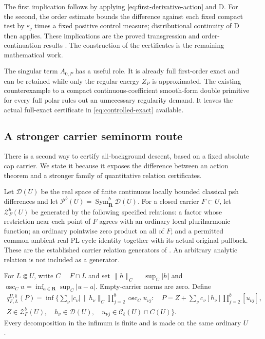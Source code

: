 \documentclass[11pt,a4paper]{article}
\newcommand{\MathEqref}[1]{{\hypersetup{linkcolor=EquationLink}\eqref{#1}}}
\theoremstyle{definition}
\theoremstyle{remark}
\numberwithin{equation}{section}
\newcommand{\R}{\mathbf R}
\newcommand{\D}{\mathrm D}
\newcommand{\Cb}{\mathcal C_b}
\newcommand{\osc}{\operatorname{osc}}
\newcommand{\Sym}{\operatorname{Sym}}
\begin{document}
The first implication follows by applying
\MathEqref{eq:first-derivative-action} and $\D$.  For the second, the
order estimate bounds the difference against each fixed compact test
by $\varepsilon_j$ times a fixed positive control measure; distributional
continuity of $\D$ then applies.  These implications are the proved
transgression and order-continuation results \cite{QA,Order}.  The
construction of the certificates is the remaining mathematical work.

The singular term $A_{0,P}$ has a useful role.  It is already full
first-order exact and can be retained while only the regular energy
$Z_P$ is approximated.  The existing counterexample to a compact
continuous-coefficient smooth-form double primitive for every full
polar \cite{R24} rules out an unnecessary regularity demand.  It leaves
the actual full-exact certificate in
\MathEqref{eq:controlled-exact} available.

\subsection{A stronger carrier seminorm route}

There is a second way to certify all-background descent, based on a
fixed absolute cap carrier.  We state it because it exposes the
difference between an action theorem and a stronger family of
quantitative relation certificates.

Let $\mathcal D(U)$ be the real space of finite continuous locally
bounded classical psh differences and let
$\mathcal P^b(U)=\Sym^b_\R\mathcal D(U)$.  For a closed carrier
$F\subset U$, let $\mathcal Z_F^b(U)$ be generated by the following
specified relations: a factor whose restriction near each point of $F$
agrees with an ordinary local pluriharmonic function; an ordinary
pointwise zero product on all of $F$; and a permitted common ambient
real PL cycle identity together with its actual original pullback.
These are the established carrier relation generators of \cite{R24}.
An arbitrary analytic relation is not included as a generator.

For $L\Subset U$, write $C=F\cap L$ and set
$\|h\|_C=\sup_C|h|$ and
$\osc_Cu=\inf_{a\in\R}\sup_C|u-a|$.  Empty-carrier norms are zero.
Define
\begin{equation}
 \begin{split}
 q^{U,b}_{F,L}(P)=\inf\biggl\{
   \sum_\nu |c_\nu|\,\|h_\nu\|_C
                       \prod_{j=2}^{b}\osc_Cu_{\nu j}:\quad
   P=Z+\sum_\nu c_\nu[h_\nu]\prod_{j=2}^{b}[u_{\nu j}],\\[-2pt]
   Z\in\mathcal Z_F^b(U),\quad h_\nu\in\mathcal D(U),\quad
   u_{\nu j}\in\Cb(U)\cap C(U)\biggr\}.
 \end{split}
 \label{eq:carrier-seminorm}
\end{equation}
Every decomposition in the infimum is finite and is made on the same
ordinary $U$.
\end{document}
